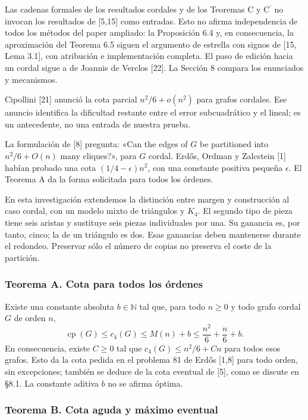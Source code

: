 \documentclass[spanish,11pt,a4paper]{article}
\begin{document}
Las cadenas formales de los resultados cordales y de los Teoremas C y \texorpdfstring{C\ensuremath{^{\prime}}}{C'} no invocan los resultados de {[}5,15{]} como entradas. Esto no afirma independencia de todos los métodos del paper ampliado: la Proposición 6.4 y, en consecuencia, la aproximación del Teorema 6.5 siguen el argumento de estrella con signos de {[}15, Lema 3.1{]}, con atribución e implementación completa. El paso de edición hacia un cordal sigue a de Joannis de Verclos {[}22{]}. La Sección 8 compara los enunciados y mecanismos.

Cipollini {[}21{]} anunció la cota parcial \(n^2/6+o(n^2)\) para grafos cordales. Ese anuncio identifica la dificultad restante entre el error subcuadrático y el lineal; es un antecedente, no una entrada de nuestra prueba.

La formulación de {[}8{]} pregunta: «Can the edges of \(G\) be partitioned into \(n^2/6+O(n)\) many cliques?», para \(G\) cordal. Erdős, Ordman y Zalcstein {[}1{]} habían probado una cota \((1/4-\epsilon)n^2\), con una constante positiva pequeña \(\epsilon\). El Teorema A da la forma solicitada para todos los órdenes.

En esta investigación extendemos la distinción entre margen y construcción al caso cordal, con un modelo mixto de triángulos y \(K_4\). El segundo tipo de pieza tiene seis aristas y sustituye seis piezas individuales por una. Su ganancia es, por tanto, cinco; la de un triángulo es dos. Esas ganancias deben mantenerse durante el redondeo. Preservar sólo el número de copias no preserva el coste de la partición.

\subsubsection{Teorema A. Cota para todos los órdenes}\label{teorema-a.-cota-para-todos-los-ordenes}

Existe una constante absoluta \(b\in\mathbb N\) tal que, para todo \(n\ge0\) y todo grafo cordal \(G\) de orden \(n\), \[
\operatorname{cp}(G)\le c_4(G)\le M(n)+b
\le\frac{n^2}{6}+\frac n6+b.
\tag{A}
\] En consecuencia, existe \(C\ge0\) tal que \(c_4(G)\le n^2/6+Cn\) para todos esos grafos. Esto da la cota pedida en el problema 81 de Erdős {[}1,8{]} para todo orden, sin excepciones; también se deduce de la cota eventual de {[}5{]}, como se discute en §8.1. La constante aditiva \(b\) no se afirma óptima.

\subsubsection{Teorema B. Cota aguda y máximo eventual}\label{teorema-b.-cota-aguda-y-maximo-eventual}
\end{document}
